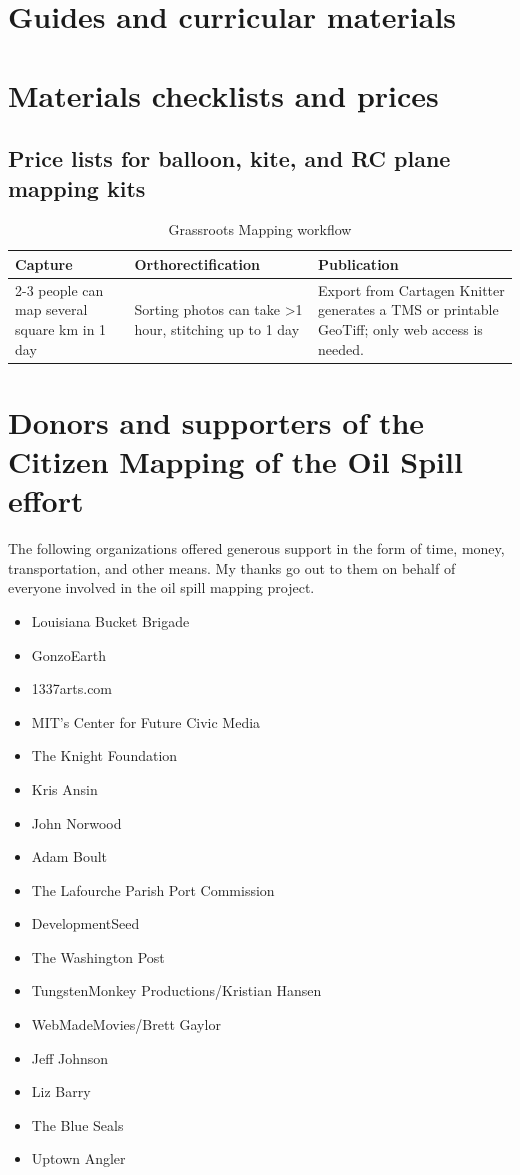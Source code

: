 \documentclass[11pt,oneside,notitlepage]{report}
\newcommand{\otoprule}{\midrule[\heavyrulewidth]}
\begin{document}
\chapter{Guides and curricular materials}


\chapter{Materials checklists and prices}

\section{Price lists for balloon, kite, and RC plane mapping kits}

\begin{table}[tp] 
\caption{Grassroots Mapping workflow}
\centering %
\renewcommand{\arraystretch}{1.4}
\begin{tabularx}{\textwidth}{YYY}
\toprule
Capture&Orthorectification&Publication\\\otoprule
2-3 people can map several square km in 1 day&Sorting photos can take \textgreater1 hour, stitching up to 1 day&Export from Cartagen Knitter generates a TMS or printable GeoTiff; only web access is needed.\\\bottomrule 
\end{tabularx}
\end{table}

\chapter{Donors and supporters of the Citizen Mapping of the Oil Spill effort}

The following organizations offered generous support in the form of time, money, transportation, and other means. My thanks go out to them on behalf of everyone involved in the oil spill mapping project. 

\begin{itemize}
\item{Louisiana Bucket Brigade}
\item{GonzoEarth}
\item{1337arts.com}
\item{MIT's Center for Future Civic Media}
\item{The Knight Foundation}
\item{Kris Ansin}
\item{John Norwood}
\item{Adam Boult}
\item{The Lafourche Parish Port Commission}
\item{DevelopmentSeed}
\item{The Washington Post}
\item{TungstenMonkey Productions/Kristian Hansen}
\item{WebMadeMovies/Brett Gaylor}
\item{Jeff Johnson}
\item{Liz Barry}
\item{The Blue Seals}
\item{Uptown Angler}


\end{itemize}
\end{document}
